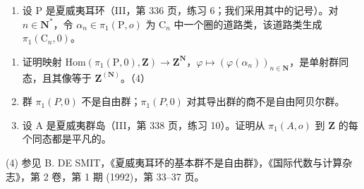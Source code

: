 \begin{enumerate}
\def\labelenumi{\arabic{enumi})}
\setcounter{enumi}{4}
\tightlist
\item
  设 P 是夏威夷耳环（III，第 336 页，练习 6；我们采用其中的记号）。对 \(n \in \mathbf{N}^*\)，令 \(\alpha_n \in \pi_1(\mathrm{P}, o)\) 为 \(\mathrm{C}_n\) 中一个圈的道路类，该道路类生成 \(\pi_1(\mathrm{C}_n, 0)\)。
\end{enumerate}

\begin{enumerate}
\def\labelenumi{\alph{enumi})}
\item
  证明映射 \(\mathrm{Hom}(\pi_{1}(\mathrm{P},0),\mathbf{Z})\to\mathbf{Z}^{\mathbf{N}}\)，\(\varphi\mapsto(\varphi(\alpha_{n}))_{n\in\mathbf{N}}\)，是单射群同态，且其像等于 \(\mathbf{Z}^{(\mathbf{N})}\)。（4）
\item
  群 \(\pi_{1}(P,0)\) 不是自由群；\(\pi_{1}(P,0)\) 对其导出群的商不是自由阿贝尔群。
\item
  设 A 是夏威夷群岛（III，第 338 页，练习 10）。证明从 \(\pi_1(A, o)\) 到 \(\mathbf{Z}\) 的每个同态都是平凡的。
\end{enumerate}

(4) 参见 B. DE SMIT，《夏威夷耳环的基本群不是自由群》，《国际代数与计算杂志》，第 2 卷，第 1 期 (1992)，第 33–37 页。

